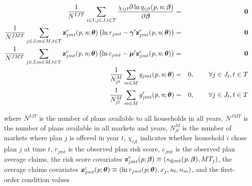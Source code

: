\documentclass[12pt]{article}
\begin{document}
	\begin{eqnarray}\label{moment_conditions}
	\frac{1}{N^{IJT}} \sum_{i\in I, j \in J, t \in T} \frac{ \chi_{ijt} \partial  \ln  q_{ijt}(\textit{p},\textit{n};\boldsymbol{\beta})}{\partial \boldsymbol{\beta}} &=& {\bf 0} \nonumber \\
	\frac{1}{N^{JMT}} \sum_{j \in J,m \in M,t \in T} {\bf z}_{jmt}^r(\textit{p},\textit{n};\boldsymbol{\theta}) \left(\ln r_{jmt} - \boldsymbol{\gamma}'   {\bf z}_{jmt}^r(\textit{p},\textit{n};\boldsymbol{\theta}) \right)  &=& {\bf 0} \nonumber  \\ 
	\frac{1}{N^{JMT}} \sum_{j \in J,m \in M,t \in T} {\bf z}_{jmt}^c(\textit{p},\textit{n};\boldsymbol{\theta}) \left(\ln c_{jmt} - \boldsymbol{\mu}'   {\bf z}_{jmt}^c(\textit{p},\textit{n};\boldsymbol{\theta}) \right)  &=& {\bf 0} \nonumber  \\ 	
	\frac{1}{N_{jt}^M} \sum_{m \in M} g_{jmt}(\textit{p},\textit{n};\boldsymbol{\theta}) &=& 0,  \hspace{0.3in} \forall j \in J_t,t \in T \nonumber \\
	\frac{1}{N_{jt}^M} \sum_{m \in M} g'_{jmt}(\textit{p},\textit{n};\boldsymbol{\theta}) &=& 0,  \hspace{0.3in} \forall j \in J_t,t \in T 
	\end{eqnarray}
	
\noindent where $N^{IJT}$ is the number of plans available to all households in all years, $N^{JMT}$ is the number of plans available in all markets and years, $N_{jt}^M$ is the number of markets where plan $j$ is offered in year $t$, $\chi_{ijt}$ indicates whether household $i$ chose plan $j$ at time $t$, $r_{jmt}$ is the observed plan risk score, $c_{jmt}$ is the observed plan average claims, the risk score covariates ${\bf z}_{jmt}^r(\textit{p};\boldsymbol{\beta}) \equiv (s_{djmt}(\textit{p},\boldsymbol{\beta}),MT_j)$, the average claims covariates ${\bf z}_{jmt}^c(\textit{p};\boldsymbol{\theta}) \equiv (\ln r_{jmt}(\textit{p};\boldsymbol{\theta}),x_j,u_t,n_m)$, and the first-order condition values
\end{document}

